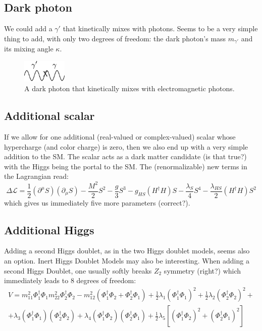 \documentclass[11pt,singleside,a4paper,makeidx,notitlepage]{article}
\begin{document}
\subsection*{Dark photon}
\label{sec:photon}
We could add a $\gamma'$ that kinetically mixes with photons. Seems to be a
very simple thing to add, with only two degrees of freedom: the dark photon's
mass $m_{\gamma'}$ and its mixing angle $\kappa$.
\begin{figure}[h!t]
\begin{center}
\includegraphics[width=60pt]{kinetic_mixing.png}
\caption{A dark photon that kinetically mixes with electromagnetic photons.}
\label{fig_darkphoton}
\end{center}
\end{figure}

\subsection*{Additional scalar}
\label{sec:scalar}
If we allow for one additional (real-valued or complex-valued) scalar whose
hypercharge (and color charge) is zero, then we also end up with a very simple
addition to the SM. The scalar acts as a dark matter candidate (is that true?)
with the Higgs being the portal to the SM. The (renormalizable) new terms in the Lagrangian
read:
\begin{equation}
 \Delta \mathcal{L} = \frac{1}{2} (\partial^{\mu} S) (\partial_{\mu} S) -
\frac{M^2}{2} S^{2} - \frac{g}{3} S^3 - g_{HS} (H^{\dagger} H) S -
\frac{\lambda_S}{4}S^4 - \frac{\lambda_{HS}}{2} (H^{\dagger} H) S^2
\end{equation}
which gives us immediately five more parameters (correct?).

\subsection*{Additional Higgs}
\label{sec:higgs}
Adding a second Higgs doublet, as in the two Higgs doublet models, seems also 
an option. Inert Higgs Doublet Models may also be interesting. 
When adding a second Higgs Doublet, one usually softly breaks $Z_2$ symmetry
(right?) which immediately leads to 8 degrees of freedom:
\begin{eqnarray}
 V = m_{11}^2 \Phi_1^\dagger \Phi_1 m_{22}^2 \Phi_2^\dagger \Phi_2 - m_{12}^2
\left( \Phi_1^\dagger \Phi_2 + \Phi_2^\dagger \Phi_1 \right) + \frac{1}{2}
\lambda_1 (\Phi_1^\dagger \Phi_1)^2  + \frac{1}{2} \lambda_2 (\Phi_2^\dagger
\Phi_2)^2 + \\ 
+ \lambda_3 (\Phi_1^\dagger \Phi_1) (\Phi_2^\dagger \Phi_2) +
\lambda_4 (\Phi_1^\dagger \Phi_2) (\Phi_2^\dagger \Phi_1) + \frac{1}{2}
\lambda_5 \left[ (\Phi_1^\dagger \Phi_2)^2 + (\Phi_2^\dagger \Phi_1)^2   \right]
\end{eqnarray}
\end{document}
